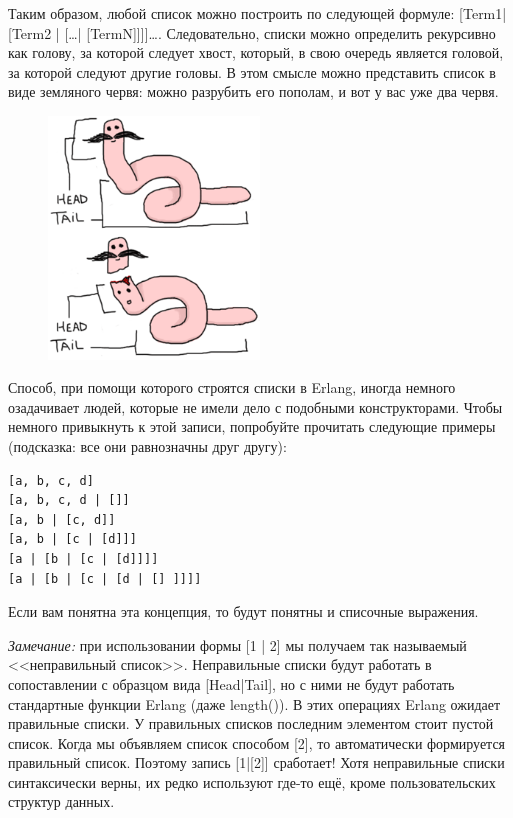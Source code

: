 \documentclass[a4paper,12pt]{report}
\newcommand{\ops}{\colorbox{lgreen}}
\begin{document}
Таким образом, любой список можно построить по следующей формуле: \ops{[Term1| [Term2 | [\ldots | [TermN]]]]\ldots}. Следовательно, списки можно определить рекурсивно как голову, за которой следует хвост, который, в свою очередь является головой, за которой следуют другие головы. В этом смысле можно представить список в виде земляного червя: можно разрубить его пополам, и вот у вас уже два червя.

\begin{figure}[h!]
    \includegraphics[width=0.5\textwidth]{worm.png}
\end{figure} 

Способ, при помощи которого строятся списки в Erlang, иногда немного озадачивает людей, которые не имели дело с подобными конструкторами. Чтобы немного привыкнуть к этой записи, попробуйте прочитать следующие примеры (подсказка: все они равнозначны друг другу):\\ 
\begin{lstlisting}[style=repl]
[a, b, c, d]
[a, b, c, d | []]
[a, b | [c, d]]
[a, b | [c | [d]]]
[a | [b | [c | [d]]]]
[a | [b | [c | [d | [] ]]]]
\end{lstlisting}

Если вам понятна эта концепция, то будут понятны и списочные выражения.\\ 
\colorbox{lgray}
{
    \begin{minipage}{1.0\linewidth}
        \emph{Замечание:} при использовании формы \ops{[1 | 2]} мы получаем так называемый <<неправильный список>>. Неправильные списки будут работать в сопоставлении с образцом вида \ops{[Head|Tail]}, но с ними не будут работать стандартные функции Erlang (даже \ops{length()}). В этих операциях Erlang ожидает правильные списки. У правильных списков последним элементом стоит пустой список. Когда мы объявляем список способом \ops{[2]}, то автоматически формируется правильный список. Поэтому запись \ops{[1|[2]]} сработает! Хотя неправильные списки синтаксически верны, их редко используют где\--то ещё, кроме пользовательских структур данных.
    \end{minipage}
}
\end{document}
